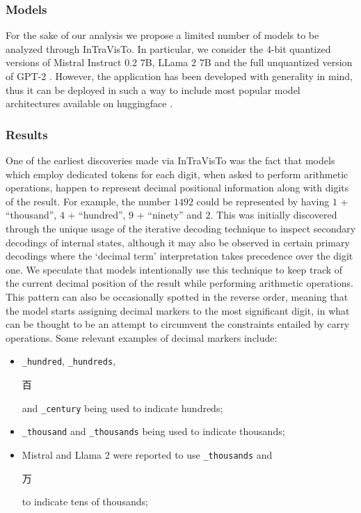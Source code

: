 \subsubsection{Models}

For the sake of our analysis we propose a limited number of models to be analyzed through InTraVisTo.
In particular, we consider the $4$-bit quantized versions of Mistral Instruct 0.2 7B, LLama 2 7B and the full unquantized version of GPT-2 .
However, the application has been developed with generality in mind, thus it can be deployed in such a way to include most popular model architectures available on huggingface .

\subsubsection{Results}

\begin{figure}[t!]
    \centering
    \label{fig:exp_intravisto_4_A}
\end{figure}

One of the earliest discoveries made via InTraVisTo was the fact that models which employ dedicated tokens for each digit, when asked to perform arithmetic operations, happen to represent decimal positional information along with digits of the result.
For example, the number $1492$ could be represented by having $1$ + ``thousand'', $4$ + ``hundred'', $9$ + ``ninety'' and $2$.
This was initially discovered through the unique usage of the iterative decoding technique  to inspect secondary decodings of internal states, although it may also be observed in certain primary decodings where the `decimal term' interpretation takes precedence over the digit one.
We speculate that models intentionally use this technique to keep track of the current decimal position of the result while performing arithmetic operations.
This pattern can also be occasionally spotted in the reverse order, meaning that the model starts assigning decimal markers to the most significant digit, in what can be thought to be an attempt to circumvent the constraints entailed by carry operations.
Some relevant examples of decimal markers include:
\begin{itemize}
    \item \texttt{\_hundred}, \texttt{\_hundreds}, \begin{CJK}{UTF8}{goth}百\end{CJK} and \texttt{\_century} being used to indicate hundreds;
    \item \texttt{\_thousand} and \texttt{\_thousands} being used to indicate thousands;
    \item Mistral and Llama 2 were reported to use \texttt{\_thousands} and \begin{CJK}{UTF8}{goth}万\end{CJK} to indicate tens of thousands;
\end{itemize}

